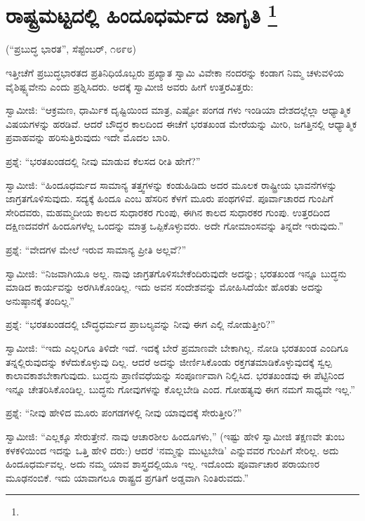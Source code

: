
\chapter[ರಾಷ್ಟ್ರಮಟ್ಟದಲ್ಲಿ ಹಿಂದೂಧರ್ಮದ ಜಾಗೃತಿ ]{ರಾಷ್ಟ್ರಮಟ್ಟದಲ್ಲಿ ಹಿಂದೂಧರ್ಮದ ಜಾಗೃತಿ \protect\footnote{}}

\centerline{(“ಪ್ರಬುದ್ಧ ಭಾರತ”, ಸೆಪ್ಟೆಂಬರ್​, ೧೮೯೮)}

ಇತ್ತೀಚೆಗೆ ಪ್ರಬುದ್ಧಭಾರತದ ಪ್ರತಿನಿಧಿಯೊಬ್ಬರು ಪ್ರಖ್ಯಾತ ಸ್ವಾಮಿ ವಿವೇಕಾ ನಂದರನ್ನು ಕಂಡಾಗ ನಿಮ್ಮ ಚಳುವಳಿಯ ವೈಶಿಷ್ಟ್ಯವೇನು ಎಂದು ಪ್ರಶ್ನಿಸಿದರು. ಅದಕ್ಕೆ ಸ್ವಾಮೀಜಿ ಅವರು ಹೀಗೆ ಉತ್ತರವಿತ್ತರು:

ಸ್ವಾಮೀಜಿ: “ಆಕ್ರಮಣ, ಧಾರ್ಮಿಕ ದೃಷ್ಟಿಯಿಂದ ಮಾತ್ರ, ಎಷ್ಟೋ ಪಂಗಡ ಗಳು ಇಂಡಿಯಾ ದೇಶದಲ್ಲೆಲ್ಲಾ ಆಧ್ಯಾತ್ಮಿಕ ವಿಷಯಗಳನ್ನು ಹರಡಿವೆ. ಆದರೆ ಬೌದ್ಧರ ಕಾಲದಿಂದ ಈಚೆಗೆ ಭರತಖಂಡ ಮೇರೆಯನ್ನು ಮೀರಿ, ಜಗತ್ತಿನಲ್ಲಿ ಆಧ್ಯಾತ್ಮಿಕ ಪ್ರವಾಹವನ್ನು ಹರಿಸುತ್ತಿರುವುದು ಇದೇ ಮೊದಲ ಬಾರಿ.

ಪ್ರಶ್ನೆ: “ಭರತಖಂಡದಲ್ಲಿ ನೀವು ಮಾಡುವ ಕೆಲಸದ ರೀತಿ ಹೇಗೆ?”

ಸ್ವಾಮೀಜಿ: “ಹಿಂದೂಧರ್ಮದ ಸಾಮಾನ್ಯ ತತ್ತ್ವಗಳನ್ನು ಕಂಡುಹಿಡಿದು ಅದರ ಮೂಲಕ ರಾಷ್ಟ್ರೀಯ ಭಾವನೆಗಳನ್ನು ಜಾಗ್ರತಗೊಳಿಸುವುದು. ಸದ್ಯಕ್ಕೆ ಹಿಂದೂ ಎಂಬ ಹೆಸರಿನ ಕೆಳಗೆ ಮೂರು ಪಂಥಗಳಿವೆ. ಪೂರ್ವಾಚಾರದ ಗುಂಪಿಗೆ ಸೇರಿದವರು, ಮಹಮ್ಮದೀಯ ಕಾಲದ ಸುಧಾರಕರ ಗುಂಪು, ಈಗಿನ ಕಾಲದ ಸುಧಾರಕರ ಗುಂಪು. ಉತ್ತರದಿಂದ ದಕ್ಷಿಣದವರೆಗೆ ಹಿಂದೂಗಳೆಲ್ಲ ಒಂದನ್ನು ಮಾತ್ರ ಒಪ್ಪಿಕೊಳ್ಳುವರು. ಅದೇ ಗೋಮಾಂಸವನ್ನು ತಿನ್ನದೇ ಇರುವುದು.”

ಪ್ರಶ್ನೆ: “ವೇದಗಳ ಮೇಲೆ ಇರುವ ಸಾಮಾನ್ಯ ಪ್ರೀತಿ ಅಲ್ಲವೆ?”

ಸ್ವಾಮೀಜಿ: “ನಿಜವಾಗಿಯೂ ಅಲ್ಲ. ನಾವು ಜಾಗ್ರತಗೊಳಿಸಬೇಕೆಂದಿರುವುದೇ ಅದನ್ನು; ಭರತಖಂಡ ಇನ್ನೂ ಬುದ್ಧನು ಮಾಡಿದ ಕಾರ್ಯವನ್ನು ಅರಗಿಸಿಕೊಂಡಿಲ್ಲ. ಇದು ಅವನ ಸಂದೇಶವನ್ನು ಮೋಹಿಸಿದೆಯೇ ಹೊರತು ಅದನ್ನು ಅನುಷ್ಠಾನಕ್ಕೆ ತಂದಿಲ್ಲ.”

ಪ್ರಶ್ನೆ: “ಭರತಖಂಡದಲ್ಲಿ ಬೌದ್ಧಧರ್ಮದ ಪ್ರಾಬಲ್ಯವನ್ನು ನೀವು ಈಗ ಎಲ್ಲಿ ನೋಡುತ್ತೀರಿ?”

ಸ್ವಾಮೀಜಿ: “ಇದು ಎಲ್ಲರಿಗೂ ತಿಳಿದೇ ಇದೆ. ಇದಕ್ಕೆ ಬೇರೆ ಪ್ರಮಾಣವೇ ಬೇಕಾಗಿಲ್ಲ. ನೋಡಿ ಭರತಖಂಡ ಎಂದಿಗೂ ತನ್ನಲ್ಲಿರುವುದನ್ನು ಕಳೆದುಕೊಳ್ಳುವು ದಿಲ್ಲ. ಆದರೆ ಅದನ್ನು ಜೀರ್ಣಿಸಿಕೊಂಡು ರಕ್ತಗತಮಾಡಿಕೊಳ್ಳುವುದಕ್ಕೆ ಸ್ವಲ್ಪ ಕಾಲಾವಕಾಶಬೇಕಾಗುವುದು. ಬುದ್ಧನು ಪ್ರಾಣಿವಧೆಯನ್ನು ಸಂಪೂರ್ಣವಾಗಿ ನಿಲ್ಲಿಸಿದ. ಭರತಖಂಡವು ಈ ಪೆಟ್ಟಿನಿಂದ ಇನ್ನೂ ಚೇತರಿಸಿಕೊಂಡಿಲ್ಲ. ಬುದ್ಧನು ಗೋವುಗಳನ್ನು ಕೊಲ್ಲಬೇಡಿ ಎಂದ. ಗೋಹತ್ಯವು ಈಗ ನಮಗೆ ಸಾಧ್ಯವೇ ಇಲ್ಲ.”

ಪ್ರಶ್ನೆ: “ನೀವು ಹೇಳಿದ ಮೂರು ಪಂಗಡಗಳಲ್ಲಿ ನೀವು ಯಾವುದಕ್ಕೆ ಸೇರುತ್ತೀರಿ?”

ಸ್ವಾಮೀಜಿ: “ಎಲ್ಲಕ್ಕೂ ಸೇರುತ್ತೇನೆ. ನಾವು ಆಚಾರಶೀಲ ಹಿಂದೂಗಳು,” (ಇಷ್ಟು ಹೇಳಿ ಸ್ವಾಮೀಜಿ ತಕ್ಷಣವೇ ತುಂಬ ಕಳಕಳಿಯಿಂದ ಇದನ್ನು ಒತ್ತಿ ಹೇಳಿ ದರು:) ಆದರೆ ‘ನಮ್ಮನ್ನು ಮುಟ್ಟಬೇಡಿ’ ಎನ್ನುವವರ ಗುಂಪಿಗೆ ಸೇರಿಲ್ಲ. ಅದು ಹಿಂದೂಧರ್ಮವಲ್ಲ. ಅದು ನಮ್ಮ ಯಾವ ಶಾಸ್ತ್ರದಲ್ಲಿಯೂ ಇಲ್ಲ. ಇದೊಂದು ಪೂರ್ವಾಚಾರ ಪರಾಯಣರ ಮೂಢನಂಬಿಕೆ. ಇದು ಯಾವಾಗಲೂ ರಾಷ್ಟ್ರದ ಪ್ರಗತಿಗೆ ಅಡ್ಡವಾಗಿ ನಿಂತಿರುವದು.”

